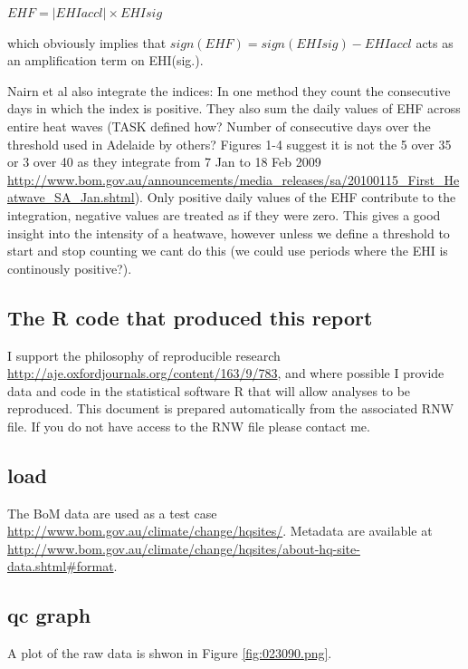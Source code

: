 \documentclass[a4paper]{article}
\begin{document}
 $EHF = | EHI{accl} | \times EHI{sig}$
 
 which obviously implies that $sign(EHF) = sign(EHI{sig}) - EHI{accl}$ acts as an amplification term on EHI(sig.).
 
 Nairn et al also integrate the indices:  In one method they count the consecutive days in which the index is positive.
 They also sum the daily values of EHF across entire heat waves (TASK defined how?  Number of consecutive days over the threshold used in Adelaide by others?  Figures 1-4 suggest it is not the 5 over 35 or 3 over 40 as they integrate from 7 Jan to 18 Feb 2009  \url{http://www.bom.gov.au/announcements/media_releases/sa/20100115_First_Heatwave_SA_Jan.shtml}).  Only positive daily values of the EHF contribute to the integration, negative values are treated as if they were zero.  This gives a good insight into the intensity of a heatwave, however unless we define a threshold to start and stop counting we cant do this (we could use periods where the EHI is continously positive?).
 

\subsection{The R code that produced this report}
I support the philosophy of reproducible research \url{http://aje.oxfordjournals.org/content/163/9/783}, and where possible I provide data and code in the statistical software R that will allow analyses to be reproduced.  This document is prepared automatically from the associated RNW file.  If you do not have access to the RNW file please contact me.



\subsection{load}
The BoM data are used as a test case \url{http://www.bom.gov.au/climate/change/hqsites/}.  Metadata are available at \url{http://www.bom.gov.au/climate/change/hqsites/about-hq-site-data.shtml#format}.
 

\subsection{qc graph}
A plot of the raw data is shwon in Figure \ref{fig:023090.png}.
 
\end{document}
